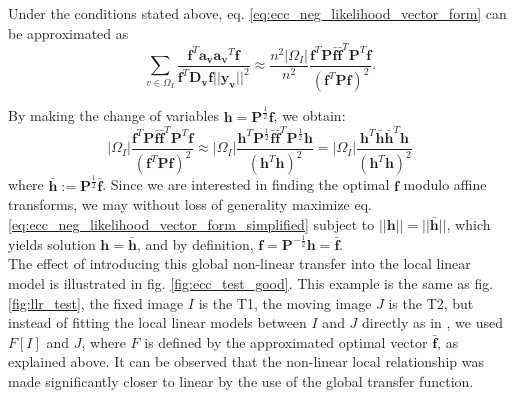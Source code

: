 Under the conditions stated above, eq. \eqref{eq:ecc_neg_likelihood_vector_form} can be approximated as
\begin{equation}
    \sum_{v\in\Omega_{I}}\frac{\mathbf{f}^{T}\mathbf{a_{v}}\mathbf{a_{v}}^{T}\mathbf{f}}
    {\mathbf{f}^{T} \mathbf{D_{v}} \mathbf{f}||\mathbf{y_{v}}||^{2}} \approx 
    \frac{n^{2}|\Omega_{I}|}{n^{2}}
    \frac{\mathbf{f}^{T}\mathbf{P}\mathbf{\bar{f}}\mathbf{\bar{f}}^{T}\mathbf{P}^{T}\mathbf{f}}{\left(\mathbf{f}^{T} \mathbf{P} \mathbf{f}\right)^{2}}.
\end{equation}

By making the change of variables $\mathbf{h} = \mathbf{P}^{\frac{1}{2}}\mathbf{f}$, we obtain:
\begin{equation}\label{eq:ecc_neg_likelihood_vector_form_simplified}
    |\Omega_{I}|
    \frac{\mathbf{f}^{T}\mathbf{P}\mathbf{\bar{f}}\mathbf{\bar{f}}^{T}\mathbf{P}^{T}\mathbf{f}}{\left(\mathbf{f}^{T} \mathbf{P} \mathbf{f}\right)^{2}} \approx 
    |\Omega_{I}| \frac{\mathbf{h}^{T}\mathbf{P}^{\frac{1}{2}}\mathbf{\bar{f}}\mathbf{\bar{f}}^{T}\mathbf{P}^{\frac{1}{2}}\mathbf{h}} {\left(\mathbf{h}^{T}\mathbf{h}\right)^{2}} =
    |\Omega_{I}| \frac{\mathbf{h}^{T}\mathbf{\bar{h}}\mathbf{\bar{h}}^{T}\mathbf{h}} {\left(\mathbf{h}^{T}\mathbf{h}\right)^{2}}
\end{equation}
where $\mathbf{\bar{h}} := \mathbf{P}^{\frac{1}{2}}\mathbf{\bar{f}}$. Since we are interested in finding the optimal $\mathbf{f}$ modulo affine transforms, we may without loss of generality maximize eq. \eqref{eq:ecc_neg_likelihood_vector_form_simplified} subject to $||\mathbf{h}|| = ||\mathbf{\bar{h}}||$, which yields solution $\mathbf{h} = \mathbf{\bar{h}}$, and by definition, $\mathbf{f} = \mathbf{P}^{-\frac{1}{2}}\mathbf{h} = \mathbf{\bar{f}}$.\\

The effect of introducing this global non-linear transfer into the local linear model is illustrated in fig. \ref{fig:ecc_test_good}. This example is the same as fig. \ref{fig:llr_test}, the fixed image $I$ is the T1, the moving image $J$ is the T2, but instead of fitting the local linear models between $I$ and $J$ directly as in \cite{Wang2014}, we used $F[I]$ and $J$, where $F$ is defined by the approximated optimal vector $\mathbf{\bar{f}}$, as explained above. It can be observed that the non-linear local relationship was made significantly closer to linear by the use of the global transfer function.\\

